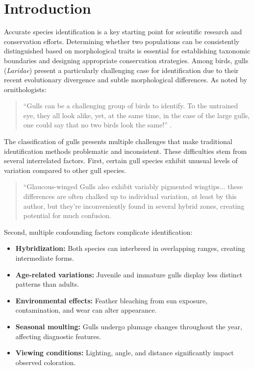 

\section*{Introduction}

Accurate species identification is a key starting point for scientific research and conservation efforts. Determining whether two populations can be consistently distinguished based on morphological traits is essential for establishing taxonomic boundaries and designing appropriate conservation strategies. Among birds, gulls (\textit{Laridae}) present a particularly challenging case for identification due to their recent evolutionary divergence and subtle morphological differences. As noted by ornithologists:

\begin{quote}
    ``Gulls can be a challenging group of birds to identify. To the untrained eye, they all look alike, yet, at the same time, in the case of the large gulls, one could say that no two birds look the same!'' \citep{ayyash2024}.
\end{quote}


The classification of gulls presents multiple challenges that make traditional identification methods problematic and inconsistent. These difficulties stem from several interrelated factors. First, certain gull species exhibit unusual levels of variation compared to other gull species.

\begin{quote}
``Glaucous-winged Gulls also exhibit variably pigmented wingtips... these differences are often chalked up to individual
variation, at least by this author, but they're inconveniently found in several hybrid zones, creating potential for much
confusion.
\end{quote}

Second, multiple confounding factors complicate identification:
\begin{itemize}
    \item \textbf{Hybridization:} Both species can interbreed in overlapping ranges, creating intermediate forms.
    \item \textbf{Age-related variations:} Juvenile and immature gulls display less distinct patterns than adults.
    \item \textbf{Environmental effects:} Feather bleaching from sun exposure, contamination, and wear can alter appearance.
    \item \textbf{Seasonal moulting:} Gulls undergo plumage changes throughout the year, affecting diagnostic features.
    \item \textbf{Viewing conditions:} Lighting, angle, and distance significantly impact observed coloration.
\end{itemize}

